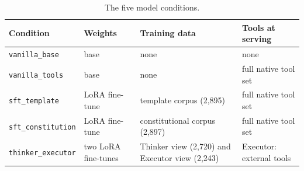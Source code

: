 \begin{table}[H]
  \centering
  \caption{The five model conditions.}
  \label{tab:conditions}
  \begin{tabular}{llp{4.5cm}l}
    \hline
    Condition & Weights & Training data & Tools at serving \\
    \hline
    \texttt{vanilla\_base} & base & none & none \\
    \texttt{vanilla\_tools} & base & none & full native tool set \\
    \texttt{sft\_template} & LoRA fine-tune & template corpus (2,895) & full native tool set \\
    \texttt{sft\_constitution} & LoRA fine-tune & constitutional corpus (2,897) & full native tool set \\
    \texttt{thinker\_executor} & two LoRA fine-tunes & Thinker view (2,720) and Executor view (2,243) & Executor: external tools \\
    \hline
  \end{tabular}
\end{table}
